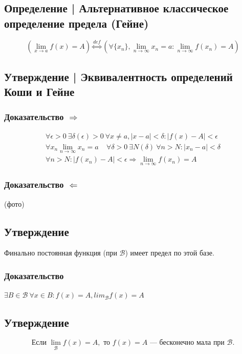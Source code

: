 \documentclass{article}
\begin{document}
\subsection{Определение | Альтернативное классическое определение предела (Гейне)}
\[
    (\lim_{x \to a} f(x) = A) \overset{def}{\Leftrightarrow} (\forall \{x_n\}, \lim_{n \to \infty} x_n = a: \lim_{n \to \infty} f(x_n) = A)
\]

\subsection{Утверждение | Эквивалентность определений Коши и Гейне}

\subsubsection{Доказательство $\Rightarrow$}
\begin{gather*}
    \forall \epsilon > 0~\exists \delta(\epsilon) > 0~\forall x \neq a, |x - a| < \delta: |f(x) - A| < \epsilon \\
    \forall x_n \lim_{n \to \infty} x_n = a~~~~~\forall \delta > 0~\exists N(\delta)~\forall n > N: |x_n - a| < \delta \\
    \forall n > N: |f(x_n) - A| < \epsilon \Rightarrow \lim_{n \to \infty} f(x_n) = A
\end{gather*}


\subsubsection{Доказательство $\Leftarrow$}
(фото)

\subsection{Утверждение}
Финально постоянная функция (при $\mathcal{B}$) имеет предел по этой базе.

\subsubsection{Доказательство}
$\exists B \in \mathcal{B}~\forall x \in B: f(x) = A, lim_{\mathcal{B}} f(x) = A$

\subsection{Утверждение}
\[
\text{Если } \lim_{\mathcal{B}} f(x) = A, \text{ то } f(x) = A \text{ --- бесконечно мала при } \mathcal{B}.
\]
\end{document}
